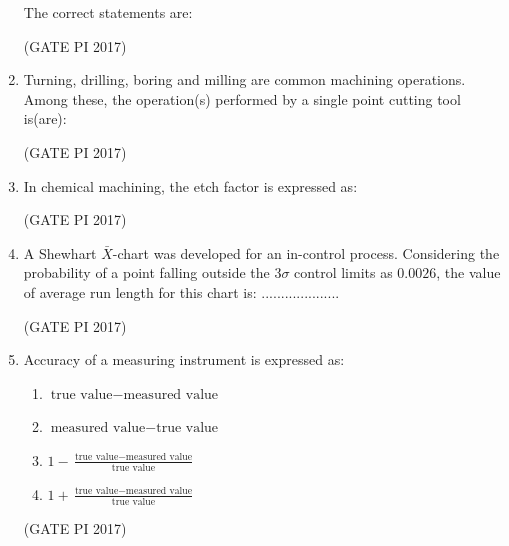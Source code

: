 \documentclass[journal,12pt,onecolumn]{IEEEtran}
\theoremstyle{remark}
\begin{document}
\begin{enumerate}
The correct statements are:
\begin{enumerate}
\end{enumerate}
\hfill (GATE PI 2017)

\item Turning, drilling, boring and milling are common machining operations. Among these, the operation(s) performed by a single point cutting tool is(are):
\begin{enumerate}
\end{enumerate}
\hfill (GATE PI 2017)

\newpage
\item In chemical machining, the etch factor is expressed as:
\begin{enumerate}
\end{enumerate}
\hfill (GATE PI 2017)
\newline
\item A Shewhart $\bar{X}$-chart was developed for an in-control process. Considering the probability of a point falling outside the $3\sigma$ control limits as $0.0026$, the value of average run length for this chart is:  
....................   

\hfill (GATE PI 2017)

\item Accuracy of a measuring instrument is expressed as:
\begin{enumerate}
\item $\text{true value} - \text{measured value}$
\item $\text{measured value} - \text{true value}$
\item $1 - \frac{\text{true value} - \text{measured value}}{\text{true value}}$
\item $1 + \frac{\text{true value} - \text{measured value}}{\text{true value}}$
\end{enumerate}
\hfill (GATE PI 2017)


\end{enumerate}
\end{document}

